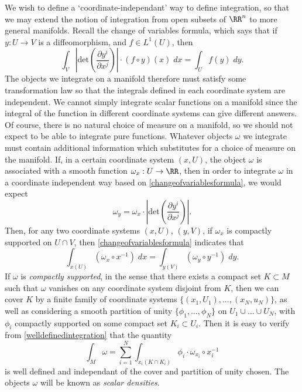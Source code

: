 We wish to define a `coordinate-independant' way to define integration, so that we may extend the notion of integration from open subsets of $\RR^n$ to more general manifolds. Recall the change of variables formula, which says that if $y: U \to V$ is a diffeomorphism, and $f \in L^1(U)$, then
%
\begin{equation} \label{changeofvariablesformula}
    \int_V \left|\text{det} \left( \frac{\partial y^i}{\partial x^j} \right) \right| \cdot (f \circ y)(x)\; dx = \int_U f(y)\; dy.
\end{equation}
%
The objects we integrate on a manifold therefore must satisfy some transformation law so that the integrals defined in each coordinate system are independent. We cannot simply integrate scalar functions on a manifold since the integral of the function in different coordinate systems can give different answers. Of course, there is no natural choice of measure on a manifold, so we should not expect to be able to integrate pure functions. Whatever objects $\omega$ we integrate must contain additional information which substitutes for a choice of measure on the manifold. If, in a certain coordinate system $(x,U)$, the object $\omega$ is associated with a smooth function $\omega_x: U \to \RR$, then in order to integrate $\omega$ in a coordinate independent way based on \eqref{changeofvariablesformula}, we would expect
%
\begin{equation}
    \omega_y = \omega_x \cdot \left| \text{det} \left( \frac{\partial y^i}{\partial x^j} \right) \right|.
\end{equation}
%
Then, for any two coordinate systems $(x,U)$, $(y,V)$, if $\omega_x$ is compactly supported on $U \cap V$, then \eqref{changeofvariablesformula} indicates that
%
\begin{equation} \label{welldefinedintegration}
    \int_{x(U)} (\omega_x \circ x^{-1})\; dx = \int_{y(V)} (\omega_y \circ y^{-1})\; dy.
\end{equation}
%
If $\omega$ is \emph{compactly supported}, in the sense that there exists a compact set $K \subset M$ such that $\omega$ vanishes on any coordinate system disjoint from $K$, then we can cover $K$ by a finite family of coordinate systems $\{ (x_1,U_1), \dots, (x_N,u_N) \}$, as well as considering a smooth partition of unity $\{ \phi_1, \dots, \phi_N \}$ on $U_1 \cup \dots \cup U_N$, with $\phi_i$ compactly supported on some compact set $K_i \subset U_i$. Then it is easy to verify from \eqref{welldefinedintegration} that the quantity
%
\begin{equation} \label{integration}
    \int_M \omega = \sum_{i = 1}^N \int_{x_i(K \cap K_i)} \phi_i \cdot \omega_{x_i} \circ x_i^{-1}
\end{equation}
%
is well defined and independant of the cover and partition of unity chosen. The objects $\omega$ will be known as {\it scalar densities}.

